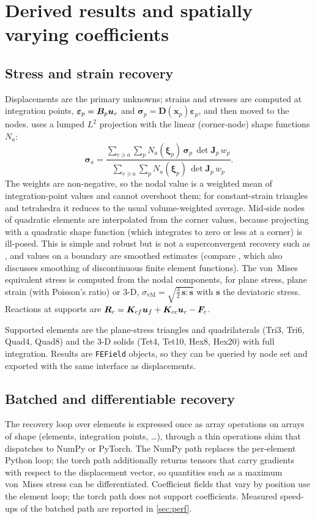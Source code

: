 \section{Derived results and spatially varying coefficients}\label{sec:recovery}

\subsection{Stress and strain recovery}
Displacements are the primary unknowns; strains and stresses are computed at integration points, $\bm\varepsilon_p=\bm B_p\bm{u}_e$ and $\bm\sigma_p=\bm D(\bm x_p)\bm\varepsilon_p$, and then moved to the nodes.
\fea{} uses a lumped $L^2$ projection with the linear (corner-node) shape functions $N_a$:
\begin{equation}
  \bm\sigma_a=\frac{\sum_{e\ni a}\sum_p N_a(\bm\xi_p)\,\bm\sigma_p\,\det\bm J_p\,w_p}{\sum_{e\ni a}\sum_p N_a(\bm\xi_p)\,\det\bm J_p\,w_p}.
  \label{eq:l2}
\end{equation}
The weights are non-negative, so the nodal value is a weighted mean of integration-point values and cannot overshoot them; for constant-strain triangles and tetrahedra it reduces to the usual volume-weighted average.
Mid-side nodes of quadratic elements are interpolated from the corner values, because projecting with a quadratic shape function (which integrates to zero or less at a corner) is ill-posed.
This is simple and robust but is not a superconvergent recovery such as \cite{zienkiewicz1992spr}, and values on a boundary are smoothed estimates (compare \cite{hinton1974smoothing}, which also discusses smoothing of discontinuous finite element functions).
The von~Mises equivalent stress is computed from the nodal components, for plane stress, plane strain (with Poisson's ratio) or 3-D,
$\sigma_{\mathrm{vM}}=\sqrt{\tfrac32\,\bm s\!:\!\bm s}$ with $\bm s$ the deviatoric stress. Reactions at supports are $\bm R_c=\bm{K}_{cf}\bm{u}_f+\bm{K}_{cc}\bm{u}_c-\bm{F}_c$.

Supported elements are the plane-stress triangles and quadrilaterals (Tri3, Tri6, Quad4, Quad8) and the 3-D solids (Tet4, Tet10, Hex8, Hex20) with full integration. Results are \texttt{FEField} objects, so they
can be queried by node set and exported with the same interface as displacements.

\subsection{Batched and differentiable recovery}
The recovery loop over elements is expressed once as array operations on arrays of shape (elements, integration points, \dots), through a thin operations shim that dispatches to NumPy or PyTorch. The NumPy path
replaces the per-element Python loop; the torch path additionally returns tensors that carry gradients with respect to the displacement vector, so quantities such as a maximum von~Mises stress can be differentiated.
Coefficient fields that vary by position use the element loop; the torch path does not support coefficients. Measured speed-ups of the batched path are reported in \cref{sec:perf}.

